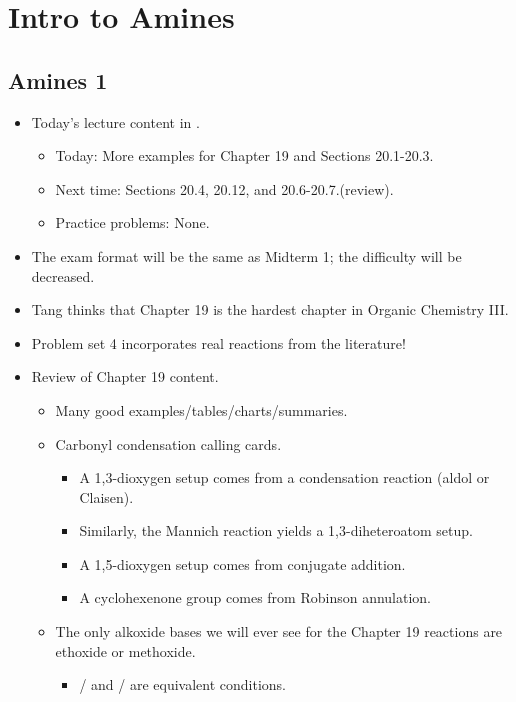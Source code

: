 \documentclass[../notes.tex]{subfiles}
\begin{document}
\chapter{Intro to Amines}
\section{Amines 1}
\begin{itemize}
    \item {}Today's lecture content in \textcite{bib:SolomonsEtAl}.
    \begin{itemize}
        \item Today: More examples for Chapter 19 and Sections 20.1-20.3.
        \item Next time: Sections 20.4, 20.12, and 20.6-20.7.(review).
        \item Practice problems: None.
    \end{itemize}
    \item The exam format will be the same as Midterm 1; the difficulty will be decreased.
    \item Tang thinks that Chapter 19 is the hardest chapter in Organic Chemistry III.
    \item Problem set 4 incorporates real reactions from the literature!
    \item Review of Chapter 19 content.
    \begin{itemize}
        \item Many good examples/tables/charts/summaries.
        \item Carbonyl condensation calling cards.
        \begin{itemize}
            \item A 1,3-dioxygen setup comes from a condensation reaction (aldol or Claisen).
            \item Similarly, the Mannich reaction yields a 1,3-diheteroatom setup.
            \item A 1,5-dioxygen setup comes from conjugate addition.
            \item A cyclohexenone group comes from Robinson annulation.
        \end{itemize}
        \item The only alkoxide bases we will ever see for the Chapter 19 reactions are ethoxide or methoxide.
        \begin{itemize}
            \item {} /  and  /  are equivalent conditions.

\end{itemize}
\end{itemize}
\end{itemize}
\end{document}
